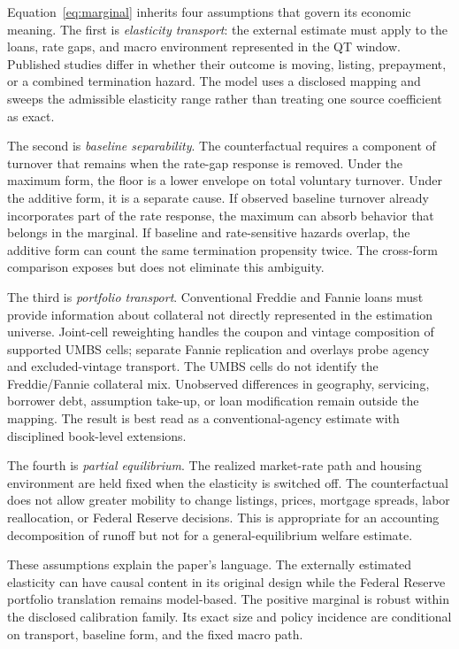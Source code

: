 Equation~\eqref{eq:marginal} inherits four assumptions that govern its economic meaning. The first is \emph{elasticity transport}: the external estimate must apply to the loans, rate gaps, and macro environment represented in the QT window. Published studies differ in whether their outcome is moving, listing, prepayment, or a combined termination hazard. The model uses a disclosed mapping and sweeps the admissible elasticity range rather than treating one source coefficient as exact.

The second is \emph{baseline separability}. The counterfactual requires a component of turnover that remains when the rate-gap response is removed. Under the maximum form, the floor is a lower envelope on total voluntary turnover. Under the additive form, it is a separate cause. If observed baseline turnover already incorporates part of the rate response, the maximum can absorb behavior that belongs in the marginal. If baseline and rate-sensitive hazards overlap, the additive form can count the same termination propensity twice. The cross-form comparison exposes but does not eliminate this ambiguity.

The third is \emph{portfolio transport}. Conventional Freddie and Fannie loans must provide information about collateral not directly represented in the estimation universe. Joint-cell reweighting handles the coupon and vintage composition of supported UMBS cells; separate Fannie replication and overlays probe agency and excluded-vintage transport. The UMBS cells do not identify the Freddie/Fannie collateral mix. Unobserved differences in geography, servicing, borrower debt, assumption take-up, or loan modification remain outside the mapping. The result is best read as a conventional-agency estimate with disciplined book-level extensions.

The fourth is \emph{partial equilibrium}. The realized market-rate path and housing environment are held fixed when the elasticity is switched off. The counterfactual does not allow greater mobility to change listings, prices, mortgage spreads, labor reallocation, or Federal Reserve decisions. This is appropriate for an accounting decomposition of runoff but not for a general-equilibrium welfare estimate.

These assumptions explain the paper's language. The externally estimated elasticity can have causal content in its original design while the Federal Reserve portfolio translation remains model-based. The positive marginal is robust within the disclosed calibration family. Its exact size and policy incidence are conditional on transport, baseline form, and the fixed macro path.

